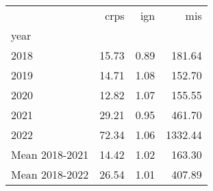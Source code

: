 \begin{tabular}{lrrr}
\toprule
 & crps & ign & mis \\
year &  &  &  \\
\midrule
2018 & 15.73 & 0.89 & 181.64 \\
2019 & 14.71 & 1.08 & 152.70 \\
2020 & 12.82 & 1.07 & 155.55 \\
2021 & 29.21 & 0.95 & 461.70 \\
2022 & 72.34 & 1.06 & 1332.44 \\
Mean 2018-2021 & 14.42 & 1.02 & 163.30 \\
Mean 2018-2022 & 26.54 & 1.01 & 407.89 \\
\bottomrule
\end{tabular}
